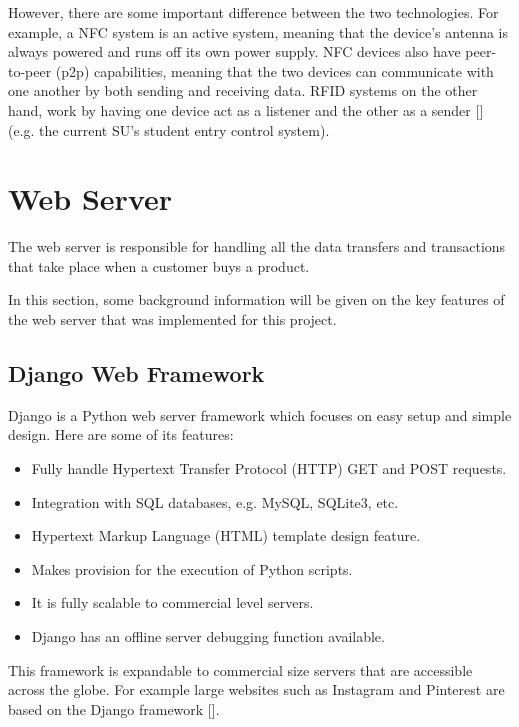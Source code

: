 However, there are some important difference between the two technologies. For example, a NFC
system is  an active system, meaning that the device's antenna is always powered and runs off
its own  power supply. NFC devices also have peer-to-peer (p2p) capabilities, meaning that the
two  devices can communicate with one another by both sending and receiving data.
RFID systems on the  other hand, work by having one device act as a listener and the other as a
sender [\cite{article:diff-nfc-rfid}] (e.g. the current SU's student entry control system).

\section{Web Server}

The web server is responsible for handling all the data transfers and transactions that
take place when a customer buys a product. 

In this section, some background information will be given on
the key features of the web server that was implemented for this project.

\subsection{Django Web Framework}
\label{sec:django}

Django is a Python web server framework which focuses on easy setup and simple design. Here are
some of its features:

\begin{itemize}
  \item Fully handle Hypertext Transfer Protocol (HTTP) GET and POST requests.
  \item Integration with SQL databases, e.g. MySQL, SQLite3, etc.
  \item Hypertext Markup Language (HTML) template design feature.
  \item Makes provision for the execution of Python scripts.
  \item It is fully scalable to commercial level servers.
  \item Django has an offline server debugging function available.
\end{itemize}

This framework is expandable to commercial size servers that are accessible across the
globe. For example large websites such as Instagram and Pinterest are based on the Django
framework [\cite{website:django-sites}].

